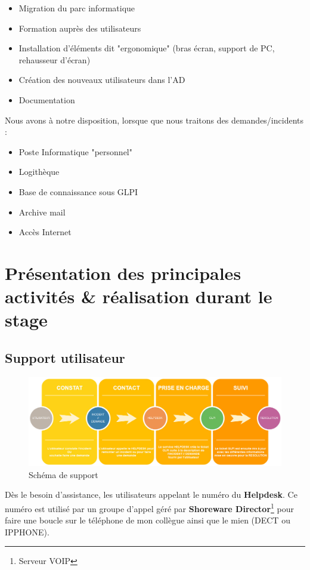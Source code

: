 \documentclass[11pt,a4paper,oneside]{article}
\begin{document}
\begin{itemize}
    \item Migration du parc informatique
    \item Formation auprès des utilisateurs
    \item Installation d'éléments dit "ergonomique" (bras écran, support de PC, rehausseur d'écran) 
    \item Création des nouveaux utilisateurs dans l'AD 
    \item Documentation
\end{itemize}

Nous avons à notre disposition, lorsque que nous traitons des demandes/incidents :

\begin{itemize}
    \item Poste Informatique "personnel"
    \item Logithèque
    \item Base de connaissance sous GLPI
    \item Archive mail
    \item Accès Internet
\end{itemize}

\newpage
\section{Présentation des principales activités \& réalisation durant le stage}
\subsection{Support utilisateur}

\begin{figure}[!h]
\centering
\includegraphics[scale=0.42]{Ressources/GLPI.jpg}
\caption{Schéma de support}
\end{figure}

Dès le besoin d'assistance, les utilisateurs appelant le numéro du \textbf{Helpdesk}. Ce numéro est utilisé par un groupe d'appel géré par \textbf{Shoreware Director}\footnote{Serveur VOIP} pour faire une boucle sur le téléphone de mon collègue ainsi que le mien (DECT ou IPPHONE). \\
\end{document}
